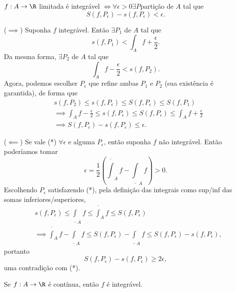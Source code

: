 \begin{prop}
    $f:A\to \R$ limitada é integrável $\iff \forall \epsilon>0 \exists P $partição de $A$ tal que  \[
    S\left( f, P_\epsilon \right) - s\left( f,P_\epsilon \right) <\epsilon \tag{*}
    .\] 
\end{prop}
\begin{demo}
    ($\implies$) Suponha $f$ integrável. Então $\exists P_1$ de $A$ tal que \[
    s\left( f, P_1 \right) < \int_A f + \frac{\epsilon}{2}
    .\] Da mesma forma, $\exists P_2$ de $A$ tal que \[
    \int_A f - \frac{\epsilon}{2} < s\left( f, P_2 \right) 
    .\] Agora, podemos escolher $P_\epsilon$ que refine ambas $P_1$ e $P_2$ (sua existência é garantida), de forma que
    \begin{align*}
	& s\left( f, P_2 \right) \le s\left( f,P_\epsilon \right) \le S\left( f,P_\epsilon \right) \le S\left( f,P_1 \right) \\
	& \implies \int_A f - \frac{\epsilon}{2} \le s\left( f,P_\epsilon \right) \le S\left( f,P_\epsilon \right) \le \int_A f + \frac{\epsilon}{2} \\
	& \implies S\left( f, P_\epsilon \right) - s\left( f, P_\epsilon \right) \le \epsilon
    .\end{align*}

    ($\impliedby$) Se vale (*) $\forall \epsilon$ e alguma $P_\epsilon$, então suponha  $f$ não integrável. Então poderíamos tomar \[
	\epsilon = \frac{1}{2}\left( \overline{\int}_A f - \underline{\int}_A f \right) > 0
    .\] Escolhendo $P_\epsilon$ satisfazendo (*), pela definição das integrais como sup/inf das somas inferiores/superiores,
    \begin{align*}
	& s\left( f, P_\epsilon \right) \le \underline{\int}_A f \le \overline{\int}_A f\le S\left( f, P_\epsilon \right) \\
	&\implies \overline{\int}_A f - \underline{\int}_A f \le S\left( f, P_\epsilon \right) - \underline{\int}_A f \le S\left( f, P_\epsilon \right) -s\left( f, P_\epsilon \right)
    ,\end{align*}
     portanto \[
	S\left( f, P_\epsilon \right) - s\left( f, P_\epsilon \right) \ge 2\epsilon
    ,\] uma contradição com (*).
\end{demo}
\begin{corollary}
    Se $f:A\to \R$ é contínua, então $f$ é integrável.
\end{corollary}
